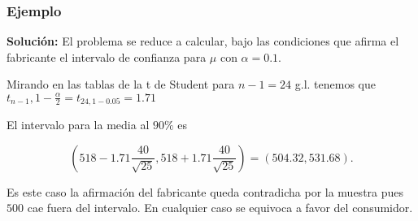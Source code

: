 \begin{frame}
\frametitle{Ejemplo}
\textbf{Solución:} El problema se reduce a  calcular, bajo las condiciones que afirma el
fabricante el intervalo de confianza para $\mu$ con $\alpha=0.1$.

Mirando en las tablas de la t de Student para $n-1=24$ g.l. tenemos que
$t_{n-1},1-\frac{\alpha}{2}=t_{24,1-0.05}=1.71$


El intervalo para la media al $90\%$ es

$$\left(518-1.71\frac{40}{\sqrt{25}}   , 518+1.71\frac{40}{\sqrt{25}}\right)=
\left(504.32,531.68\right).$$

Es este caso la afirmación del fabricante  queda contradicha por la muestra pues $500$ cae
fuera del intervalo. En cualquier caso se equivoca a favor del consumidor.
\end{frame}


